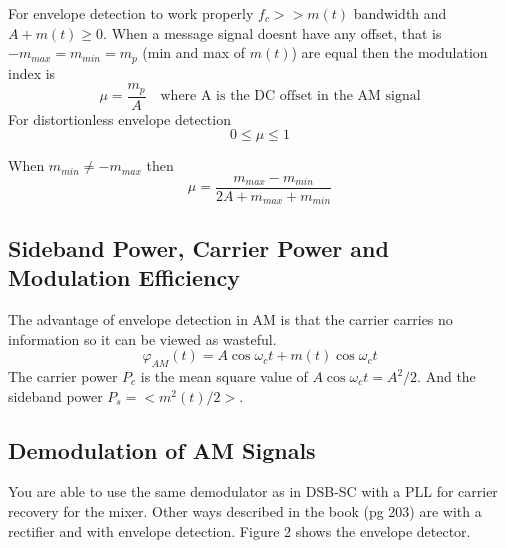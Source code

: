 \documentclass{article}
\begin{document}
    For envelope detection to work properly $f_c >> m(t)$ bandwidth and $A+m(t) \geq 0$. When a message signal doesnt have any offset, that is
    $-m_{max} = m_{min} = m_p$ (min and max of $m(t)$) are equal then the modulation index is 
    \begin{equation}
        \mu = \frac{m_p}{A} \quad \textrm{where A is the DC offset in the AM signal}
    \end{equation}
    For distortionless envelope detection
    \begin{equation}
        0 \leq \mu \leq 1
    \end{equation}

    When $m_{min} \neq -m_{max}$ then
    \begin{equation}
        \mu = \frac{m_{max}-m_{min}}{2A+m_{max}+m_{min}}
    \end{equation}

    \subsection{Sideband Power, Carrier Power and Modulation Efficiency}
    The advantage of envelope detection in AM is that the carrier carries no information so it can be viewed as wasteful.
    \begin{equation}
        \varphi_{AM}(t) = A\cos \omega_ct + m(t)\cos\omega_ct
    \end{equation}
    The carrier power $P_c$ is the mean square value of $A\cos\omega_ct = A^2/2$. And the sideband power $P_s = <m^2(t)/2>$.

    \subsection{Demodulation of AM Signals}
    You are able to use the same demodulator as in DSB-SC with a PLL for carrier recovery for the mixer. Other ways described in the book (pg 203)
    are with a rectifier and with envelope detection. Figure 2 shows the envelope detector. 
\end{document}
